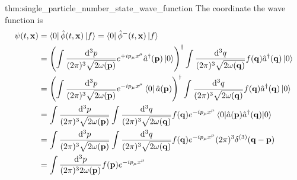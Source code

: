 \begin{delayedproof}{thm:single_particle_number_state_wave_function}
	The coordinate the wave function is
	\begin{equation}
		\begin{split}
			\psi(t,\vb{x})
			&=
			\bra{0}
			\hat\phi(t,\vb{x})
			\ket{f}
			=
			\bra{0}
			\hat\phi^-(t,\vb{x})
			\ket{f}
			\\
			&=
			\left(
				\int\frac{\dd[3]{p}}{(2\pi)^3\sqrt{2\omega(\vb{p})}}
				e^{+ip_\mu x^\mu}
				\hat{a}^\dagger(\vb{p})
				\ket{0}
			\right)^\dagger
			\int\frac{\dd[3]{q}}{(2\pi)^3\sqrt{2\omega(\vb{q})}}
			f(\vb{q})
			\hat{a}^\dagger(\vb{q})
			\ket{0}
			\\
			&=
			\left(
				\int\frac{\dd[3]{p}}{(2\pi)^3\sqrt{2\omega(\vb{p})}}
				e^{-ip_\mu x^\mu}
				\bra{0}
				\hat{a}(\vb{p})
			\right)^\dagger
			\int\frac{\dd[3]{q}}{(2\pi)^3\sqrt{2\omega(\vb{q})}}
			f(\vb{q})
			\hat{a}^\dagger(\vb{q})
			\ket{0}
			\\
			&=
			\int\frac{\dd[3]{p}}{(2\pi)^3\sqrt{2\omega(\vb{p})}}
			\int\frac{\dd[3]{q}}{(2\pi)^3\sqrt{2\omega(\vb{q})}}
			f(\vb{q})
			e^{-ip_\mu x^\mu}
			\expval{\hat{a}(\vb{p})\hat{a}^\dagger(\vb{q})}{0}
			\\
			&=
			\int\frac{\dd[3]{p}}{(2\pi)^3\sqrt{2\omega(\vb{p})}}
			\int\frac{\dd[3]{q}}{(2\pi)^3\sqrt{2\omega(\vb{q})}}
			f(\vb{q})
			e^{-ip_\mu x^\mu}
			(2\pi)^3
			\delta^{(3)}(\vb{q}-\vb{p})
			\\
			&=
			\int\frac{\dd[3]{p}}{(2\pi)^32\omega(\vb{p})}
			f(\vb{p})
			e^{-ip_\mu x^\mu}
		\end{split}
	\end{equation}
\end{delayedproof}

